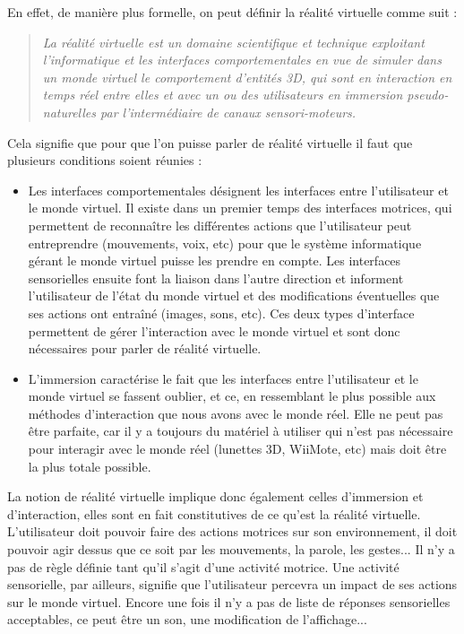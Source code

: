 En effet, de manière plus formelle, on peut définir la réalité virtuelle comme suit :\begin{quote}
\og \emph{La réalité virtuelle est un domaine scientifique et technique exploitant l'informatique et les interfaces comportementales en vue de simuler dans un monde virtuel le comportement d'entités 3D, qui sont en interaction en temps réel entre elles et avec un ou des utilisateurs en immersion pseudo-naturelles par l'intermédiaire de canaux sensori-moteurs.} \fg{}
\end{quote}
Cela signifie que pour que l'on puisse parler de réalité virtuelle il faut que plusieurs conditions soient réunies :	
\begin{itemize}
\item Les interfaces comportementales désignent les interfaces entre l'utilisateur et le monde virtuel. Il existe dans un premier temps des interfaces motrices, qui permettent de reconnaître les différentes actions que l'utilisateur peut entreprendre (mouvements, voix, etc) pour que le système informatique gérant le monde virtuel puisse les prendre en compte. Les interfaces sensorielles ensuite font la liaison dans l'autre direction et informent l'utilisateur de l'état du monde virtuel et des modifications éventuelles que ses actions ont entraîné (images, sons, etc). Ces deux types d'interface permettent de gérer l'interaction avec le monde virtuel et sont donc nécessaires pour parler de réalité virtuelle. 
\item L'immersion caractérise le fait que les interfaces entre l'utilisateur et le monde virtuel se fassent oublier, et ce, en ressemblant le plus possible aux méthodes d'interaction que nous avons avec le monde réel. Elle ne peut pas être parfaite, car il y a toujours du matériel à utiliser qui n'est pas nécessaire pour interagir avec le monde réel (lunettes 3D, WiiMote, etc) mais doit être la plus totale possible.\\

\end{itemize}


La notion de réalité virtuelle implique donc également celles d'immersion et d'interaction, elles sont en fait constitutives de ce  qu'est la réalité virtuelle. L'utilisateur doit pouvoir faire des actions motrices sur son environnement, il doit pouvoir agir dessus que ce soit par les mouvements, la parole, les gestes... Il n'y a pas de règle définie tant qu'il s'agit d'une activité motrice. 
Une activité sensorielle, par ailleurs, signifie que l'utilisateur percevra un impact de ses actions sur le monde virtuel. Encore une fois il n'y a pas de liste de réponses sensorielles acceptables, ce peut être un son, une modification de l'affichage...	%

